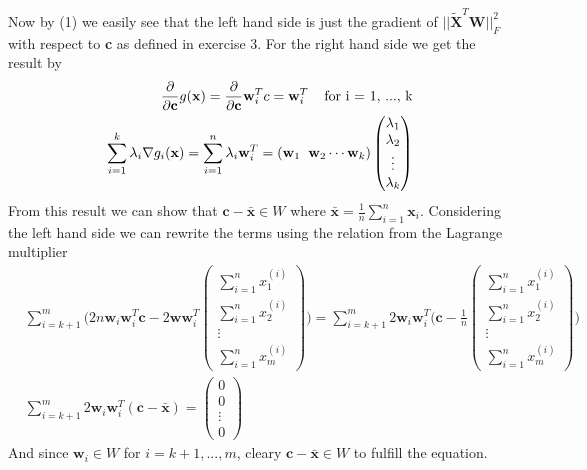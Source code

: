 \documentclass[a4paper,norsk]{article}
\begin{document}
Now by (1) we easily see that the left hand side is just the gradient of $||\tilde{\textbf{X}}^T \textbf{W} ||_F^2  $
with respect to \textbf{c} as defined in exercise 3. For the right hand side we get the result by
\begin{align*}
\frac{\partial}{\partial \textbf{c}} g(\textbf{x}) = \frac{\partial}{\partial \textbf{c}} \textbf{w}_i^T c = \textbf{w}_i^T \hspace{4mm} \text{for i = 1, ..., k} \\
\sum_{i=1}^k \lambda_i \nabla g_i(\textbf{x}) = \sum_{i=1}^n \lambda_i \textbf{w}_i^T =
(\textbf{w}_1 \hspace{2mm} \textbf{w}_2 \cdots \textbf{w}_k) 
\begin{pmatrix}\lambda_{1} \\ \lambda_{2} \\ \vdots \\ \lambda_{k} \end{pmatrix}
\end{align*}
\newline \newline
From this result we can show that $\textbf{c} - \bar{\textbf{x}} \in W$ where 
$\bar{\textbf{x}} = \frac{1}{n} \sum_{i=1}^n \textbf{x}_i$. Considering the left hand side we can rewrite the terms using the relation from the Lagrange multiplier
\begin{align*}
&\sum_{i=k+1}^m \Bigg( 2n\textbf{w}_i \textbf{w}_i^T \textbf{c} - 2 \textbf{w} \textbf{w}_i^T 
 \begin{pmatrix} \sum_{i=1}^n x_1^{(i)} \\ \sum_{i=1}^n x_2^{(i)} \\ \vdots \\ \sum_{i=1}^n x_m^{(i)} \end{pmatrix} \Bigg)	= 
\sum_{i=k+1}^m  2\textbf{w}_i \textbf{w}_i^T \Bigg(\textbf{c} -  
 \frac{1}{n} \begin{pmatrix} \sum_{i=1}^n x_1^{(i)} \\ \sum_{i=1}^n x_2^{(i)} \\ \vdots \\ \sum_{i=1}^n x_m^{(i)} \end{pmatrix} \Bigg)	\\
&\sum_{i=k+1}^m  2\textbf{w}_i \textbf{w}_i^T (\textbf{c} - \bar{\textbf{x}})  = \begin{pmatrix} 0 \\ 0 \\ \vdots \\0 \end{pmatrix}
\end{align*}
And since $\textbf{w}_i \in W$ for $i = k+1,...,m$, cleary $\textbf{c} - \bar{\textbf{x}} \in W$ to fulfill the equation.
\end{document}
